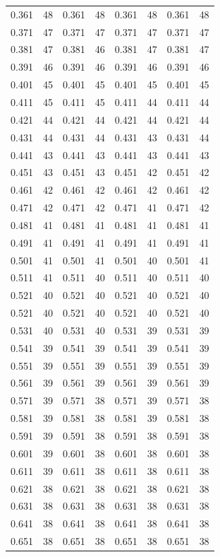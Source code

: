\documentclass[12pt, a4paper]{article}
\begin{document}
\begin{center}
\begin{longtable}{| c | c | c | c | c | c | c | c |}
0.361 & 48 & 0.361 & 48 & 0.361 & 48 & 0.361 & 48 \\
0.371 & 47 & 0.371 & 47 & 0.371 & 47 & 0.371 & 47 \\
0.381 & 47 & 0.381 & 46 & 0.381 & 47 & 0.381 & 47 \\
0.391 & 46 & 0.391 & 46 & 0.391 & 46 & 0.391 & 46 \\
0.401 & 45 & 0.401 & 45 & 0.401 & 45 & 0.401 & 45 \\
0.411 & 45 & 0.411 & 45 & 0.411 & 44 & 0.411 & 44 \\
0.421 & 44 & 0.421 & 44 & 0.421 & 44 & 0.421 & 44 \\
0.431 & 44 & 0.431 & 44 & 0.431 & 43 & 0.431 & 44 \\
0.441 & 43 & 0.441 & 43 & 0.441 & 43 & 0.441 & 43 \\
0.451 & 43 & 0.451 & 43 & 0.451 & 42 & 0.451 & 42 \\
0.461 & 42 & 0.461 & 42 & 0.461 & 42 & 0.461 & 42 \\
0.471 & 42 & 0.471 & 42 & 0.471 & 41 & 0.471 & 42 \\
0.481 & 41 & 0.481 & 41 & 0.481 & 41 & 0.481 & 41 \\
0.491 & 41 & 0.491 & 41 & 0.491 & 41 & 0.491 & 41 \\
0.501 & 41 & 0.501 & 41 & 0.501 & 40 & 0.501 & 41 \\
0.511 & 41 & 0.511 & 40 & 0.511 & 40 & 0.511 & 40 \\
0.521 & 40 & 0.521 & 40 & 0.521 & 40 & 0.521 & 40 \\
0.521 & 40 & 0.521 & 40 & 0.521 & 40 & 0.521 & 40 \\
0.531 & 40 & 0.531 & 40 & 0.531 & 39 & 0.531 & 39 \\
0.541 & 39 & 0.541 & 39 & 0.541 & 39 & 0.541 & 39 \\
0.551 & 39 & 0.551 & 39 & 0.551 & 39 & 0.551 & 39 \\
0.561 & 39 & 0.561 & 39 & 0.561 & 39 & 0.561 & 39 \\
0.571 & 39 & 0.571 & 38 & 0.571 & 39 & 0.571 & 38 \\
0.581 & 39 & 0.581 & 38 & 0.581 & 39 & 0.581 & 38 \\
0.591 & 39 & 0.591 & 38 & 0.591 & 38 & 0.591 & 38 \\
0.601 & 39 & 0.601 & 38 & 0.601 & 38 & 0.601 & 38 \\
0.611 & 39 & 0.611 & 38 & 0.611 & 38 & 0.611 & 38 \\
0.621 & 38 & 0.621 & 38 & 0.621 & 38 & 0.621 & 38 \\
0.631 & 38 & 0.631 & 38 & 0.631 & 38 & 0.631 & 38 \\
0.641 & 38 & 0.641 & 38 & 0.641 & 38 & 0.641 & 38 \\
0.651 & 38 & 0.651 & 38 & 0.651 & 38 & 0.651 & 38

\end{longtable}
\end{center}
\end{document}
